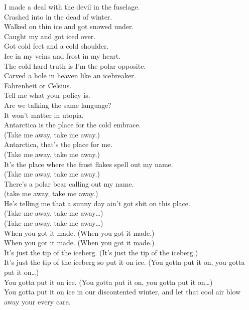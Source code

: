 I made a deal with the devil in the fuselage. \\
Crashed into  in the dead of winter. \\
Walked on thin ice and got snowed under. \\
Caught my  and got iced over. \\
Got cold feet and a cold shoulder. \\
Ice in my veins and frost in my heart. \\
The cold hard truth is I'm the polar opposite. \\
Carved a hole in heaven like an icebreaker. \\

Fahrenheit or Celsius. \\
Tell me what your policy is. \\
Are we talking the same language? \\
It won't matter in utopia. \\
Antarctica is the place for the cold embrace. \\

(Take me away, take me away.) \\
Antarctica, that's the place for me. \\
(Take me away, take me away.) \\
It's the place where the frost flakes spell out my name. \\
(Take me away, take me away.) \\
There's a polar bear calling out my name. \\
(take me away, take me away.) \\
He's telling me that a sunny day ain't got shit on this place. \\

(Take me away, take me away…) \\

(Take me away, take me away…) \\

When you got it made. (When you got it made.) \\
When you got it made. (When you got it made.) \\
It's just the tip of the iceberg. (It's just the tip of the iceberg.) \\
It's just the tip of the iceberg so put it on ice. (You gotta put it on, you gotta put it on…) \\
You gotta put it on ice. (You gotta put it on, you gotta put it on…) \\
You gotta put it on ice in our discontented winter, and let that cool air blow away your every care. \\


